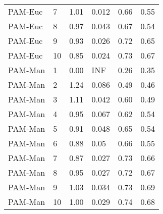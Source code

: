 \begin{table}[ht]
\begin{tabular}{llrlrr}
  PAM-Euc & 7 & 1.01 & 0.012 & 0.66 & 0.55 \\ 
  PAM-Euc & 8 & 0.97 & 0.043 & 0.67 & 0.54 \\ 
  PAM-Euc & 9 & 0.93 & 0.026 & 0.72 & 0.65 \\ 
  PAM-Euc & 10 & 0.85 & 0.024 & 0.73 & 0.67 \\ 
  PAM-Man & 1 & 0.00 & INF & 0.26 & 0.35 \\ 
  PAM-Man & 2 & 1.24 & 0.086 & 0.49 & 0.46 \\ 
  PAM-Man & 3 & 1.11 & 0.042 & 0.60 & 0.49 \\ 
  PAM-Man & 4 & 0.95 & 0.067 & 0.62 & 0.54 \\ 
  PAM-Man & 5 & 0.91 & 0.048 & 0.65 & 0.54 \\ 
  PAM-Man & 6 & 0.88 & 0.05 & 0.66 & 0.55 \\ 
  PAM-Man & 7 & 0.87 & 0.027 & 0.73 & 0.66 \\ 
  PAM-Man & 8 & 0.95 & 0.027 & 0.72 & 0.67 \\ 
  PAM-Man & 9 & 1.03 & 0.034 & 0.73 & 0.69 \\ 
  PAM-Man & 10 & 1.00 & 0.029 & 0.74 & 0.68 \\ 
   \hline
\end{tabular}
\end{table}
